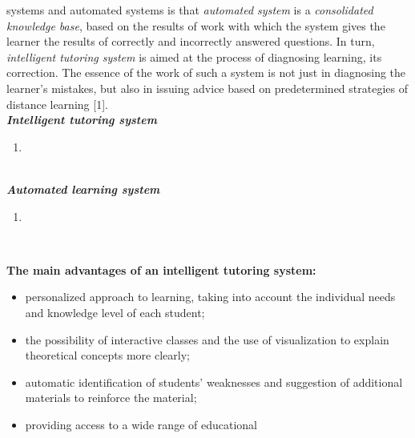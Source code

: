 \documentclass{article}
\begin{document}
\begin{multicols}
{systems} and automated systems is that \textit{automated system}
is a \textit{consolidated knowledge base}, based on the results
of work with which the system gives the learner the
results of correctly and incorrectly answered questions.
In turn, \textit{intelligent tutoring system} is aimed at the process
of diagnosing learning, its correction. The essence of
the work of such a system is not just in diagnosing the
learner’s mistakes, but also in issuing advice based on
predetermined strategies of distance learning [1].\\
\newline
\textbf{\textit{Intelligent tutoring system}}
\begin{enumerate}
    \item [:=] [A set of software and hardware that uses \textit{artificial
intelligence} techniques to create interactive and adaptive educational tools. Such systems are usually able
to adapt to the individual needs and knowledge level
of each learner, offering personalized assignments,
materials selection and feedback.]
\end{enumerate} \\
\newline
\textbf{\textit{Automated learning system}}
\begin{enumerate}
    \item [:=] [A program or set of programs that facilitate or fully
automate the learning process. They may include
various functions such as organizing learning material, creating tests and assignments, and tracking
student progress. Such systems are usually designed
to optimize the learning process, reduce the time
spent on routine teacher tasks, and improve learning
efficiency.]
\end{enumerate} \\

\par
\textbf{The main advantages of an intelligent tutoring
system:}


\begin{itemize}[noitemsep,topsep=1pt,parsep=1pt,partopsep=1pt]
    \item personalized approach to learning, taking into account the individual needs and knowledge level of
each student;
\item the possibility of interactive classes and the use of
visualization to explain theoretical concepts more
clearly;
\item automatic identification of students’ weaknesses and
suggestion of additional materials to reinforce the
material;
\item providing access to a wide range of educational
\end{itemize}
    

\end{multicols}
\end{document}
